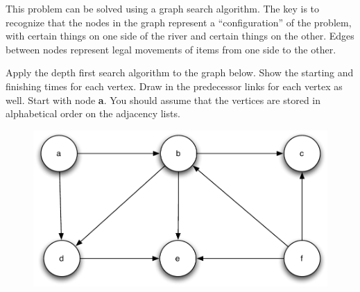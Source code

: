 \documentclass[11pt]{exam}
\begin{document}
\begin{questions}
This problem can be solved using a graph search algorithm.  The key is to recognize that the nodes in the graph represent a ``configuration'' of the problem, with certain things on one side of the river and certain things on the other.  Edges between nodes represent legal movements of items from one side to the other.

\vspace{8in}

\newpage
\question[10] Apply the depth first search algorithm to the graph below. Show the starting and finishing times for each vertex.  Draw in the  predecessor links for each vertex as well.  Start with node \textbf{a}.  You should assume that the vertices are stored in alphabetical order on the adjacency lists.
\begin{figure}[h!t]
        \begin{center}
        \includegraphics[scale=.75]{dfs}
    \end{center}
\end{figure}

\end{questions}
\end{document}
